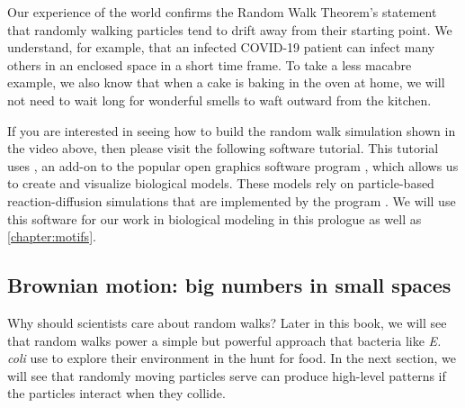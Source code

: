 \begin{note}\end{note}

Our experience of the world confirms the Random Walk Theorem's statement that randomly walking particles tend to drift away from their starting point. We understand, for example, that an infected COVID-19 patient can infect many others in an enclosed space in a short time frame. To take a less macabre example, we also know that when a cake is baking in the oven at home, we will not need to wait long for wonderful smells to waft outward from the kitchen.

If you are interested in seeing how to build the random walk simulation shown in the video above, then please visit the following software tutorial. This tutorial uses , an add-on to the popular open graphics software program  , which allows us to create and visualize biological models. These models rely on particle-based reaction-diffusion simulations that are implemented by the program  . We will use this software for our work in biological modeling in this prologue as well as \autoref{chapter:motifs}.

\begin{note}\end{note}


\FloatBarrier
{}
\subsection{Brownian motion: big numbers in small spaces}

Why should scientists care about random walks? Later in this book, we will see that random walks power a simple but powerful approach that bacteria like \textit{E. coli} use to explore their environment in the hunt for food. In the next section, we will see that randomly moving particles serve can produce high-level patterns if the particles interact when they collide.

